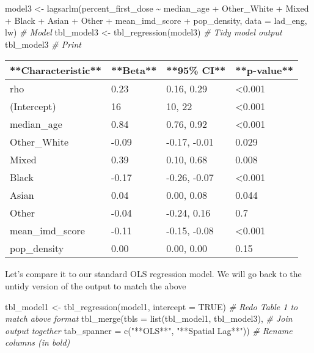 \documentclass[
]{book}
\newenvironment{Shaded}{\begin{snugshade}}{\end{snugshade}}
\newcommand{\AttributeTok}[1]{\textcolor[rgb]{0.77,0.63,0.00}{#1}}
\newcommand{\CommentTok}[1]{\textcolor[rgb]{0.56,0.35,0.01}{\textit{#1}}}
\newcommand{\ConstantTok}[1]{\textcolor[rgb]{0.00,0.00,0.00}{#1}}
\newcommand{\FunctionTok}[1]{\textcolor[rgb]{0.00,0.00,0.00}{#1}}
\newcommand{\NormalTok}[1]{#1}
\newcommand{\OtherTok}[1]{\textcolor[rgb]{0.56,0.35,0.01}{#1}}
\newcommand{\SpecialCharTok}[1]{\textcolor[rgb]{0.00,0.00,0.00}{#1}}
\newcommand{\StringTok}[1]{\textcolor[rgb]{0.31,0.60,0.02}{#1}}
\begin{document}
\begin{Shaded}
\begin{Highlighting}[]
\NormalTok{model3 }\OtherTok{\textless{}{-}} \FunctionTok{lagsarlm}\NormalTok{(percent\_first\_dose }\SpecialCharTok{\textasciitilde{}}\NormalTok{ median\_age }\SpecialCharTok{+}\NormalTok{ Other\_White }\SpecialCharTok{+}\NormalTok{ Mixed }\SpecialCharTok{+}\NormalTok{ Black }\SpecialCharTok{+}\NormalTok{ Asian }\SpecialCharTok{+}\NormalTok{ Other }\SpecialCharTok{+}\NormalTok{ mean\_imd\_score }\SpecialCharTok{+}\NormalTok{ pop\_density, }\AttributeTok{data =}\NormalTok{ lad\_eng, lw) }\CommentTok{\# Model}
\NormalTok{tbl\_model3 }\OtherTok{\textless{}{-}} \FunctionTok{tbl\_regression}\NormalTok{(model3) }\CommentTok{\# Tidy model output}
\NormalTok{tbl\_model3 }\CommentTok{\# Print}
\end{Highlighting}
\end{Shaded}

\begin{tabular}{l|l|l|l}
\hline
**Characteristic** & **Beta** & **95\% CI** & **p-value**\\
\hline
rho & 0.23 & 0.16, 0.29 & <0.001\\
\hline
(Intercept) & 16 & 10, 22 & <0.001\\
\hline
median\_age & 0.84 & 0.76, 0.92 & <0.001\\
\hline
Other\_White & -0.09 & -0.17, -0.01 & 0.029\\
\hline
Mixed & 0.39 & 0.10, 0.68 & 0.008\\
\hline
Black & -0.17 & -0.26, -0.07 & <0.001\\
\hline
Asian & 0.04 & 0.00, 0.08 & 0.044\\
\hline
Other & -0.04 & -0.24, 0.16 & 0.7\\
\hline
mean\_imd\_score & -0.11 & -0.15, -0.08 & <0.001\\
\hline
pop\_density & 0.00 & 0.00, 0.00 & 0.15\\
\hline
\end{tabular}

Let's compare it to our standard OLS regression model. We will go back to the untidy version of the output to match the above

\begin{Shaded}
\begin{Highlighting}[]
\NormalTok{tbl\_model1 }\OtherTok{\textless{}{-}} \FunctionTok{tbl\_regression}\NormalTok{(model1, }\AttributeTok{intercept =} \ConstantTok{TRUE}\NormalTok{) }\CommentTok{\# Redo Table 1 to match above format}
\FunctionTok{tbl\_merge}\NormalTok{(}\AttributeTok{tbls =} \FunctionTok{list}\NormalTok{(tbl\_model1, tbl\_model3), }\CommentTok{\# Join output together}
          \AttributeTok{tab\_spanner =} \FunctionTok{c}\NormalTok{(}\StringTok{"**OLS**"}\NormalTok{, }\StringTok{"**Spatial Lag**"}\NormalTok{)) }\CommentTok{\# Rename columns (in bold)}
\end{Highlighting}
\end{Shaded}
\end{document}
